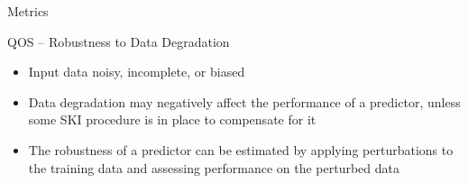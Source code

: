 \documentclass[presentation]{beamer} %
\begin{document}
{\begin{frame}{Metrics}
     \begin{block}{QOS -- Robustness to Data Degradation}
     \begin{itemize}
            \item Input data noisy, incomplete, or biased
            \item Data degradation may negatively affect the performance of a predictor, unless some  SKI procedure is in place to compensate for it
            \item The robustness of a predictor can be estimated by applying perturbations to the training data and assessing performance on the perturbed data
            \end{itemize}
%        
    \end{block}
    
\end{frame}





}\label{sec:theory-/-modelling-/-design}
\end{document}
